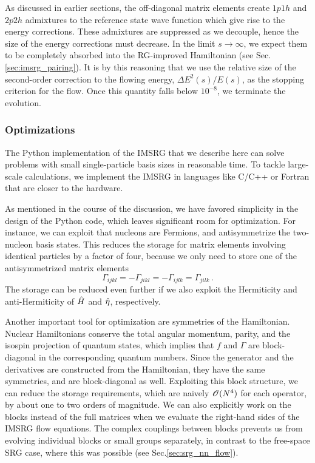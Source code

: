 {\begin{lstlisting}
\end{lstlisting}
As discussed in earlier sections, the off-diagonal matrix elements 
create $1p1h$ and $2p2h$ admixtures to the reference state wave function 
which give rise to the energy corrections. These admixtures are suppressed
as we decouple, hence the size of the energy corrections must decrease.
In the limit $s\to\infty$, we expect them to be completely absorbed into
the RG-improved Hamiltonian (see Sec.\ref{sec:imsrg_pairing}). It is
by this reasoning that we use the relative size of the second-order correction
to the flowing energy, $\Delta E^2(s)/E(s)$, as the stopping criterion for
the flow. Once this quantity falls below $10^{-8}$, we terminate the evolution.

\subsubsection*{Optimizations}
The Python implementation of the IMSRG that we describe here can solve
problems with small single-particle basis sizes in reasonable time. To 
tackle large-scale calculations, we implement the IMSRG in 
languages like C/C++ or Fortran that are closer to the hardware.

As mentioned in the course of the discussion, we have favored simplicity 
in the design of the Python code, which leaves significant room for optimization.
For instance, we can exploit that nucleons are Fermions, and 
antisymmetrize the two-nucleon basis states. This reduces the storage for
matrix elements involving identical particles by a factor of four, because
we only need to store one of the antisymmetrized matrix elements 
\begin{equation}
  \Gamma_{ijkl} = -\Gamma_{jikl} = - \Gamma_{ijlk} = \Gamma_{jilk}\,.
\end{equation}
The storage can be reduced even further if we also exploit the Hermiticity
and anti-Hermiticity of $\hat{H}$ and $\hat{\eta}$, respectively.

Another important tool for optimization are symmetries of the Hamiltonian.
Nuclear Hamiltonians conserve the total angular momentum, parity, and the 
isospin projection of quantum states, which implies that $f$ and $\Gamma$ 
are block-diagonal in the corresponding quantum numbers. Since the generator 
and the derivatives are constructed from the Hamiltonian, they have the
same symmetries, and are block-diagonal as well. Exploiting this block
structure, we can reduce the storage requirements, which are naively $\mathcal{O}(N^4)$
for each operator, by about one to two orders of magnitude. We can 
also explicitly work on the blocks instead of the full matrices when 
we evaluate the right-hand sides of the IMSRG flow equations.  The complex 
couplings between blocks prevents us from evolving individual blocks or
small groups separately, in contrast to the free-space SRG case, where
this was possible (see Sec.\ref{sec:srg_nn_flow}). 



}
